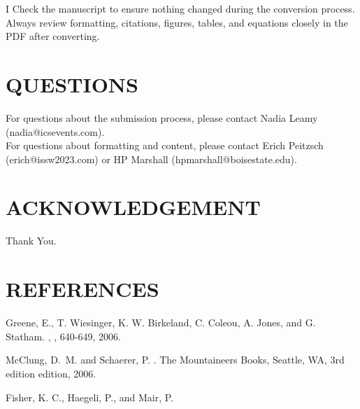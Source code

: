 \documentclass[3p,authoryear,times,twocolumn]{elsarticle_issw2018}
\begin{document}
I%
\noindent
Check the manuscript to ensure nothing changed during the conversion process. Always review formatting, citations, figures, tables, and equations closely in the PDF after converting.\\

%
\section{QUESTIONS}
For questions about the submission process, please contact Nadia Leamy (nadia@icsevents.com). \\
%
\noindent
%
For questions about formatting and content, please contact Erich Peitzsch (erich@issw2023.com) or HP Marshall (hpmarshall@boisestate.edu). %
\section*{ACKNOWLEDGEMENT} 
Thank You.
\section*{REFERENCES}

\renewcommand{\section}[2]{} %
\begin{thebibliography}{}

Greene, E., T. Wiesinger, K. W. Birkeland, C. Coleou, A. Jones, and G. Statham.
, , 640-649, 2006.

McClung, D.~M. and Schaerer, P.
.
\newblock The Mountaineers Books, Seattle, WA, 3rd edition edition, 2006.

Fisher, K. C., Haegeli, P., and Mair, P.

\end{thebibliography}


\end{document}
